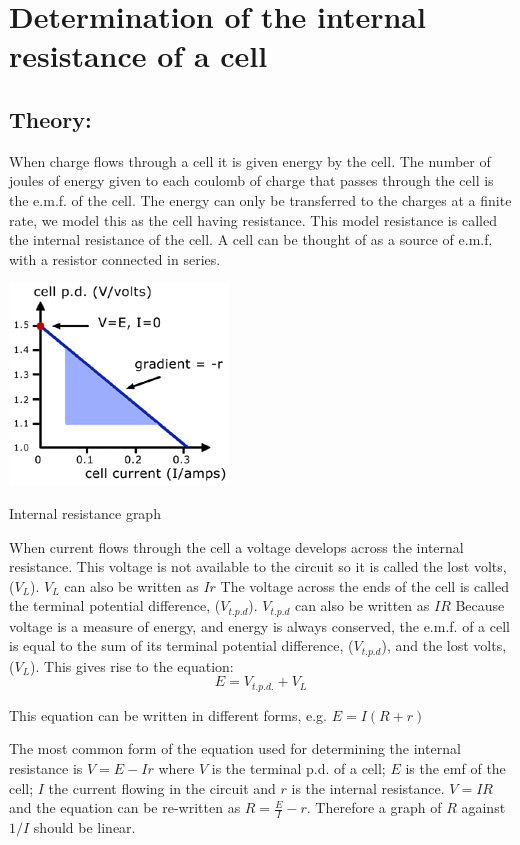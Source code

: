 \section{Determination of the internal resistance of a cell}
\subsection{Theory:} 
When charge flows through a cell it is given energy by the cell.
The number of joules of energy given to each coulomb of charge that passes through the cell is the e.m.f. of the cell.
The energy can only be transferred to the charges at a finite rate, we model this as the cell having resistance. This model resistance is called the internal resistance of the cell. A cell can be thought of as a source of e.m.f. with a resistor connected in series.\begin{marginfigure}
\includegraphics[]{intr.jpg}
\caption{Internal resistance graph}
\end{marginfigure}
When current flows through the cell a voltage develops across the internal resistance. This voltage is not available to the circuit so it is called the lost volts, ($V_{L}$).
$V_{L}$ can also be written as $Ir$
The voltage across the ends of the cell is called the terminal potential difference, ($V_{t.p.d}$).
$V_{t.p.d}$ can also be written as $IR$
Because voltage is a measure of energy, and energy is always conserved, the e.m.f. of a cell is equal to the sum of its terminal potential difference, ($V_{t.p.d}$), and the lost volts, ($V_{L}$).
This gives rise to the equation: \[E = V_{t.p.d.}+ V_{L}\]

This equation can be written in different forms, e.g. $E = I (R + r)$

The most common form of the equation used for determining the internal resistance is $V =E-Ir$ where $V$ is the terminal p.d. of a cell; $E$ is the emf of the cell; $I$  the current flowing in the circuit and $r$ is the internal resistance.  $V = IR$ and the equation can be re-written as $ R=\frac{E}{I}-r$.  Therefore a graph of $R$ against $1/I$  should be linear.   
